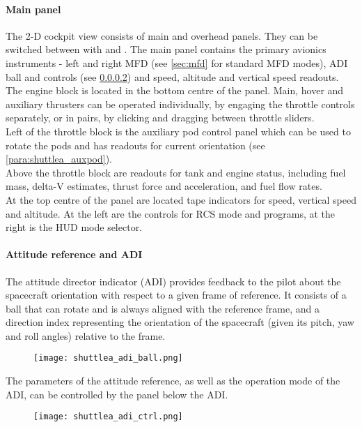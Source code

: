 \documentclass[Orbiter User Manual.tex]{subfiles}
\begin{document}
\paragraph{Main panel}
The 2-D cockpit view consists of main and overhead panels. They can be switched between with \Ctrl\UArrow and \Ctrl\DArrow. The main panel contains the primary avionics instruments - left and right MFD (see \ref{sec:mfd} for standard MFD modes), ADI ball and controls (see \ref{para:shuttlea_adi}) and speed, altitude and vertical speed readouts.\\
The engine block is located in the bottom centre of the panel. Main, hover and auxiliary thrusters can be operated individually, by engaging the throttle controls separately, or in pairs, by clicking and dragging between throttle sliders.\\
Left of the throttle block is the auxiliary pod control panel which can be used to rotate the pods and has readouts for current orientation (see \ref{para:shuttlea_auxpod}).\\
Above the throttle block are readouts for tank and engine status, including fuel mass, delta-V estimates, thrust force and acceleration, and fuel flow rates.\\
At the top centre of the panel are located tape indicators for speed, vertical speed and altitude. At the left are the controls for RCS mode and programs, at the right is the HUD mode selector.

\paragraph{Attitude reference and ADI}
\label{para:shuttlea_adi}
The attitude director indicator (ADI) provides feedback to the pilot about the spacecraft orientation with respect to a given frame of reference. It consists of a ball that can rotate and is always aligned with the reference frame, and a direction index representing the orientation of the spacecraft (given its pitch, yaw and roll angles) relative to the frame.

\begin{figure}[H]
  \centering
  \texttt{[image: shuttlea\_adi\_ball.png]}
\end{figure}

\noindent
The parameters of the attitude reference, as well as the operation mode of the ADI, can be controlled by the panel below the ADI.

\begin{figure}[H]
  \centering
  \texttt{[image: shuttlea\_adi\_ctrl.png]}
\end{figure}
\end{document}
